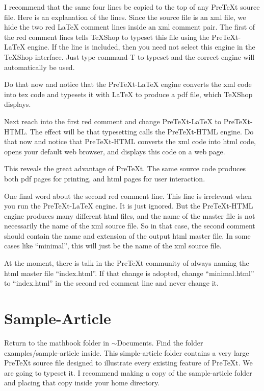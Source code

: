 \documentclass[11pt, oneside]{article}   	%
\begin{document}
I recommend that the same four lines be copied to the top of any PreTeXt source file. Here is an explanation of the lines. Since the source file is an xml file, we hide the two red LaTeX comment lines inside an xml comment pair.
The first of the red comment lines tells TeXShop to typeset this file using the PreTeXt-LaTeX engine. If the line is included, then you need not select this engine in the TeXShop interface. Just type command-T to typeset and the correct engine will automatically be used.

Do that now and notice that the PreTeXt-LaTeX engine converts the xml code into tex code and typesets it with LaTeX to produce a pdf file, which TeXShop displays.

Next reach into the first red comment and change PreTeXt-LaTeX to PreTeXt-HTML. The effect will be that typesetting calls the PreTeXt-HTML engine. Do that now and notice that PreTeXt-HTML converts the xml code into html code, opens your default web browser, and displays this code on a web page.

This reveals the great advantage of PreTeXt. The same source code produces both pdf pages for printing, and html pages for user interaction.

One final word about the second red comment line. This line is irrelevant when you run the PreTeXt-LaTeX engine. It is just ignored. But the PreTeXt-HTML engine produces many different html files, and the name of the master file is not necessarily the name of the xml source file. So in that case, the second comment should contain the name and extension of the output html master file. In some cases like ``minimal'', this will just be the name of the xml source file.

At the moment, there is talk in the PreTeXt community of always naming the html master file ``index.html''. If that change is adopted, change ``minimal.html'' to ``index.html'' in the second red comment line and never change it.

\section{Sample-Article}

Return to the mathbook folder in $\sim$Documents. Find the folder examples/sample-article inside. This simple-article folder contains a very large PreTeXt source file designed to illustrate every existing feature of PreTeXt. We are going to typeset it. I recommend making a copy of the sample-article folder and placing that copy inside your home directory.
\end{document}
